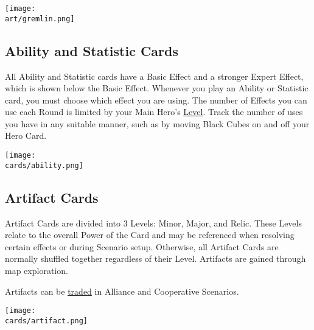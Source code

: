 \begin{multicols*}{2}
\vspace*{\fill}
\begin{center}
  \hspace{3em}
  \texttt{[image: \\art/gremlin.png]}
\end{center}

\clearpage

\subsection*{\hypertarget{Ability}{Ability and Statistic Cards}}

All Ability and Statistic cards have a Basic Effect and a stronger Expert  Effect, which is shown below the Basic Effect.
Whenever you play an Ability or Statistic card, you must choose which effect you are using.
The number of  Effects you can use each Round is limited by your Main Hero's \hyperlink{Level}{Level}.
Track the number of uses you have in any suitable manner, such as by moving Black Cubes on and off your Hero Card.\par
\bigskip

\texttt{[image: \\cards/ability.png]}


\vspace*{\fill}

\columnbreak

\subsection*{Artifact Cards}
Artifact Cards are divided into 3 Levels: Minor, Major, and Relic.
These Levels relate to the overall Power of the Card and may be referenced when resolving certain effects or during Scenario setup.
Otherwise, all Artifact Cards are normally shuffled together regardless of their Level.
Artifacts are gained through map exploration.\par
Artifacts can be \hyperlink{Trading}{traded} in Alliance and Cooperative Scenarios.\par
\texttt{[image: \\cards/artifact.png]}


\end{multicols*}
